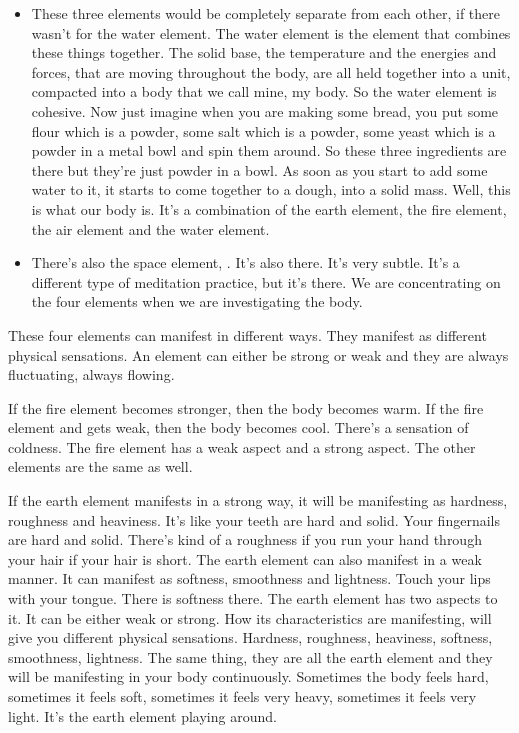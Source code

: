 \documentclass[letterpaper,10pt,english]{sphinxmanual}
\begin{document}
\begin{itemize}
\item {} 
\sphinxAtStartPar
These three elements would be completely separate from each other,
if there wasn’t for the water element. The water element is the element
that  combines  these  things  together.  The  solid  base,  the  temperature
and the energies and forces, that are moving throughout the body, are
all held together into a unit, compacted into a body that we call mine,
my  body.  So  the  water  element  is  cohesive.  Now  just  imagine  when
you  are  making  some  bread,  you  put  some  flour  which  is  a  powder,
some salt which is a powder, some yeast which is a powder in a metal
bowl  and  spin  them  around.  So  these  three  ingredients  are  there  but
they’re just powder in a bowl. As soon as you start to add some water
to it, it starts to come together to a dough, into a solid mass. Well, this
is what our body is. It’s a combination of the earth element, the fire element, the air element and the water element.

\item {} 
\sphinxAtStartPar
There’s also the space element,
. It’s also there. It’s very subtle.
It’s a different type of meditation practice, but it’s there. We are concentrating on the four elements when we are investigating the body.

\end{itemize}

\sphinxAtStartPar
These four elements can manifest in different ways. They manifest as
different physical sensations. An element can either be strong or weak and
they are always fluctuating, always flowing.

\sphinxAtStartPar
If the fire element becomes stronger, then the body becomes warm. If
the fire element and gets weak, then the body becomes cool. There’s a sensation of coldness. The fire element has a weak aspect and a strong aspect. The
other elements are the same as well.

\sphinxAtStartPar
If the earth element manifests in a strong way, it will be manifesting
as hardness, roughness and heaviness. It’s like your teeth are hard and solid.
Your fingernails are hard and solid. There’s kind of a roughness if you run
your  hand  through  your  hair  if  your  hair  is  short.  The  earth  element  can
also manifest in a weak manner. It can manifest as softness, smoothness and
  lightness.  Touch  your  lips  with  your  tongue.  There  is  softness  there.  The
earth element has two aspects to it. It can be either weak or strong. How its
characteristics are manifesting, will give you different physical sensations.
Hardness, roughness, heaviness, softness, smoothness, lightness. The same
thing,  they  are  all  the  earth  element  and  they  will  be  manifesting  in  your
body continuously. Sometimes the body feels hard, sometimes it feels soft,
sometimes  it  feels  very  heavy,  sometimes  it  feels  very  light.  It’s  the  earth
element playing around.
\end{document}
